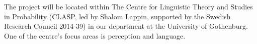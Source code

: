 \documentclass[11pt,a4paper]{article}
\begin{document}
The project will be located within The Centre for Linguistic Theory and Studies in Probability (CLASP, led by Shalom Lappin, supported by the Swedish Research Council 2014-39) in our department at the University of Gothenburg. One of the centre’s focus areas is perception and language.



{\scriptsize



}
\end{document}
